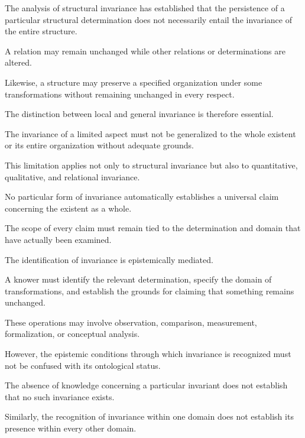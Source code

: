 
The analysis of structural invariance
has established that the persistence
of a particular structural determination
does not necessarily entail the invariance
of the entire structure.

A relation may remain unchanged while
other relations or determinations are
altered.

Likewise, a structure may preserve
a specified organization under some
transformations without remaining
unchanged in every respect.

The distinction between local and
general invariance is therefore essential.

The invariance of a limited aspect
must not be generalized to the whole
existent or its entire organization
without adequate grounds.

This limitation applies not only to
structural invariance but also to
quantitative, qualitative, and relational
invariance.

No particular form of invariance
automatically establishes a universal
claim concerning the existent as a whole.

The scope of every claim must remain
tied to the determination and domain
that have actually been examined.


The identification of invariance is
epistemically mediated.

A knower must identify the relevant
determination, specify the domain of
transformations, and establish the
grounds for claiming that something
remains unchanged.

These operations may involve observation,
comparison, measurement, formalization,
or conceptual analysis.

However, the epistemic conditions
through which invariance is recognized
must not be confused with its ontological
status.

The absence of knowledge concerning
a particular invariant does not establish
that no such invariance exists.

Similarly, the recognition of invariance
within one domain does not establish
its presence within every other domain.

